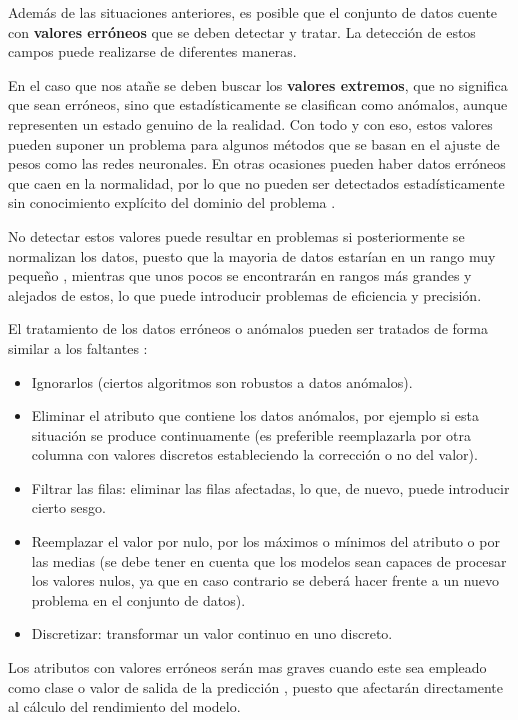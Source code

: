 Además de las situaciones anteriores, es posible que el conjunto de datos cuente con \textbf{valores erróneos} que 
se deben detectar y tratar.
La detección de estos campos puede realizarse de diferentes maneras.

En el caso que nos atañe se deben buscar los \textbf{valores extremos}, que no significa que sean erróneos, sino que 
estadísticamente se clasifican como anómalos, aunque representen un estado genuino de la realidad.
Con todo y con eso, estos valores pueden suponer un problema para algunos métodos que se basan en el ajuste de pesos
como las redes neuronales.
En otras ocasiones pueden haber datos erróneos que caen en la normalidad, por lo que no pueden ser detectados estadísticamente sin 
conocimiento explícito del dominio del problema \cite{book:hernandez2004}.

No detectar estos valores puede resultar en problemas si posteriormente se normalizan los datos, puesto
que la mayoria de datos estarían en un rango muy pequeño \cite{book:hernandez2004}, mientras que unos pocos 
se encontrarán en rangos más grandes y alejados de estos, lo que puede introducir problemas de eficiencia y precisión.

El tratamiento de los datos erróneos o anómalos pueden ser tratados de forma similar a los faltantes \cite{book:hernandez2004}:
\begin{itemize}
    \item Ignorarlos (ciertos algoritmos son robustos a datos anómalos).
    \item Eliminar el atributo que contiene los datos anómalos, por ejemplo si esta situación se produce
        continuamente (es preferible reemplazarla por otra columna con valores discretos
        estableciendo la corrección o no del valor).
    \item Filtrar las filas: eliminar las filas afectadas, lo que, de nuevo, puede introducir cierto sesgo.
    \item Reemplazar el valor por nulo, por los máximos o mínimos del atributo o por
        las medias (se debe tener en cuenta que los modelos sean capaces de procesar los valores
        nulos, ya que en caso contrario se deberá hacer frente a un nuevo problema en el conjunto
        de datos).
    \item Discretizar: transformar un valor continuo en uno discreto.
\end{itemize}
Los atributos con valores erróneos serán mas graves cuando este sea empleado como clase o valor de salida de la predicción \cite{book:hernandez2004},
puesto que afectarán directamente al cálculo del rendimiento del modelo. 


